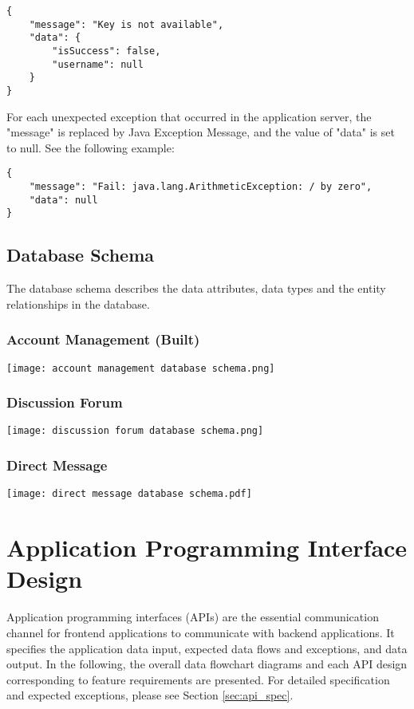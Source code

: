 \documentclass[11pt, a4paper]{article}
\begin{document}
\begin{lstlisting}[breaklines=true, frame=single]
{
    "message": "Key is not available",
    "data": {
        "isSuccess": false,
        "username": null
    }
}
\end{lstlisting}

\smallskip
For each unexpected exception that occurred in the application server, the "message" is replaced by Java Exception Message, and the value of "data" is set to null. See the following example: 

\begin{lstlisting}[breaklines=true, frame=single]
{
    "message": "Fail: java.lang.ArithmeticException: / by zero",
    "data": null
}
\end{lstlisting}

\subsection{Database Schema}
The database schema describes the data attributes, data types and the entity relationships in the database.
\subsubsection{Account Management (Built)}
\begin{center}
    \texttt{[image: account management database schema.png]}
\end{center}
\subsubsection{Discussion Forum}
\begin{center}
    \texttt{[image: discussion forum database schema.png]}
\end{center}
\subsubsection{Direct Message}
\begin{center}
    \texttt{[image: direct message database schema.pdf]}
\end{center}

\section{Application Programming Interface Design}
Application programming interfaces (APIs) are the essential communication channel for frontend applications to communicate with backend applications. It specifies the application data input, expected data flows and exceptions, and data output. In the following, the overall data flowchart diagrams and each API design corresponding to feature requirements are presented. For detailed specification and expected exceptions, please see Section \ref{sec:api_spec}.
\end{document}

